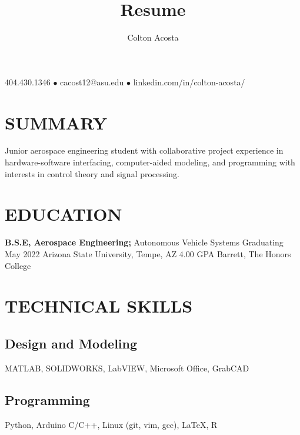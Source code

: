 \documentclass{article}
\makeatletter
\renewcommand{\maketitle}{
	\begin{center}
		{\huge\bfseries
			\theauthor}
			
		404.430.1346 $\bullet$ cacost12@asu.edu $\bullet$ linkedin.com/in/colton-acosta/
	\end{center}
}
\makeatother
\begin{document}
\title{Resume}
\author{Colton Acosta}
\maketitle
\section{SUMMARY}
Junior aerospace engineering student with collaborative project experience in hardware-software interfacing, computer-aided modeling, and programming with interests in control theory and signal processing.  
\section{EDUCATION}
\textbf{B.S.E, Aerospace Engineering;} Autonomous Vehicle Systems
\hfill 
Graduating May 2022
\linebreak
Arizona State University, Tempe, AZ 
\hfill
4.00 GPA
\linebreak
Barrett, The Honors College

\section{TECHNICAL SKILLS}
\subsection{Design and Modeling}
MATLAB, SOLIDWORKS, LabVIEW, Microsoft Office, GrabCAD
\subsection{Programming} 
Python, Arduino C/C++, Linux (git, vim, gcc), {\LaTeX}, R
\end{document}
